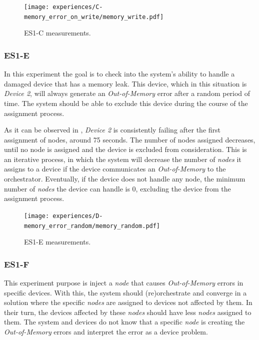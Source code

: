 \begin{figure}[h]
\centering
\texttt{[image: experiences/C-memory\_error\_on\_write/memory\_write.pdf]}
\caption[ES1-C measurements]{ES1-C measurements.}\label{fig:experiment_c_graph}
\end{figure}



\subsubsection{ES1-E}

In this experiment the goal is to check into the system's ability to handle a damaged device that has a memory leak. This device, which in this situation is \textit{Device 2}, will always generate an \textit{Out-of-Memory} error after a random period of time. The system should be able to exclude this device during the course of the assignment process.

As it can be observed in , \textit{Device 2} is consistently failing after the first assignment of nodes, around 75 seconds. The number of nodes assigned decreases, until no node is assigned and the device is excluded from consideration. This is an iterative process, in which the system will decrease the number of \textit{nodes} it assigns to a device if the device communicates an \textit{Out-of-Memory} to the orchestrator. Eventually, if the device does not handle any node, the minimum number of \textit{nodes} the device can handle is 0, excluding the device from the assignment process.

\begin{figure}[h]
\centering
\texttt{[image: experiences/D-memory\_error\_random/memory\_random.pdf]}
\caption[ES1-E measurements]{ES1-E measurements.}\label{fig:experiment_d_graph}
\end{figure}


\subsubsection{ES1-F}

This experiment purpose is inject a \textit{node} that causes \textit{Out-of-Memory} errors in specific devices. With this, the system should (re)orchestrate and converge in a solution where the specific \textit{nodes} are assigned to devices not affected by them. In their turn, the devices affected by these \textit{nodes} should have less \textit{nodes} assigned to them. The system and devices do not know that a specific \textit{node} is creating the \textit{Out-of-Memory} errors and interpret the error as a device problem.

